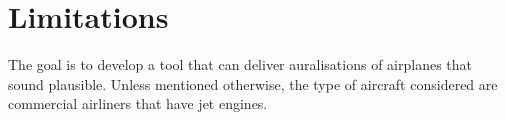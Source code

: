 \section{Limitations}
The goal is to develop a tool that can deliver auralisations of airplanes that
sound plausible. Unless mentioned otherwise, the type of aircraft considered are
commercial airliners that have jet engines.


%


